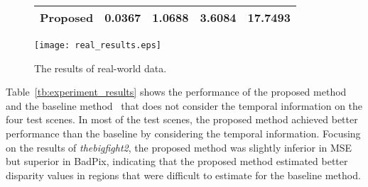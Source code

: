 \documentclass[]{spie}
\newcommand{\jtextd}[1]{}
\begin{document}
\begin{figure}[tbp]
\begin{minipage}{0.6\textwidth}
\begin{center}
{\begin{tabular}{l|cccc}
          Proposed & 0.0367 & \textbf{1.0688} & \textbf{3.6084} & \textbf{17.7493} \\
          \hline
        \end{tabular}
      }
      \label{tb:experiment_results}
    \end{center}
  \end{minipage}
  \hfill
  \begin{minipage}{0.4\textwidth}
    \begin{center}
      \texttt{[image: real\_results.eps]}
      \caption{
        The results of real-world data.
}
      \label{fig:real_results}
    \end{center}
  \end{minipage}
\end{figure}



\jtextd{
  表\ref{tb:experiment_results}に，
  提案手法と時間情報を考慮しない従来手法~\cite{faluvegi20193d}を用いて，
  4つのテストシーンの奥行きを推定した際の評価指標値を示す．
  従来手法は，提案手法のCLSTMモジュールを，
  単一の特徴マップを出力する2次元畳み込み層に置き換えた構造を持つ．
  表\ref{tb:experiment_results}より，
  時間情報を考慮することにより，ほとんどのテストシーンで
  提案手法が優れた奥行き推定性能を発揮することがわかる．
  thebigfight2の結果に着目すると，提案手法は
  MSEではわずかに劣っているもののBadPixでは優れているため，
  従来手法では推定が困難な領域において，
  提案手法はより適切に奥行きを推定できたことがわかる．
}

Table~\ref{tb:experiment_results} shows the performance of 
the proposed method and 
the baseline method~\cite{faluvegi20193d}  
that does not consider the temporal information 
on the four test scenes.
In most of the test scenes,
the proposed method achieved better performance than the baseline by
considering the temporal information.
Focusing on the results of \textit{thebigfight2}, 
the proposed method was slightly inferior in MSE 
but superior in BadPix, indicating that 
the proposed method estimated better disparity values
in regions that were difficult to estimate for the baseline method.


\jtextd{
  テストシーンambushfight5における推定結果の一部を
  図~\ref{fig:ambushfight5}に示す．
  このシーンは，ノイズの多いテクスチャを持つ岩肌が映り込み，
  2人の登場人物が争う激しい動きを含むシーケンスである．
  この例からもわかるように，提案手法は時間情報を活用することで
  ノイズの多い領域の奥行き推定を可能にする．
  また，従来手法でもエッジをうまく捉えているが，
  提案手法はより表面が滑らかな奥行きマップを推定できている．
}
\end{document}
